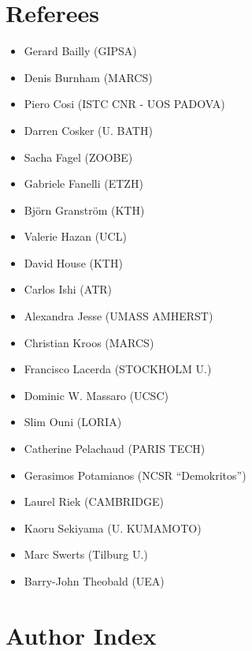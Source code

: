 \section*{Referees}
\begin{itemize}
\item Gerard Bailly (GIPSA)
\item Denis Burnham (MARCS)
\item Piero Cosi (ISTC CNR - UOS PADOVA)
\item Darren Cosker (U. BATH)
\item Sacha Fagel (ZOOBE)
\item Gabriele Fanelli (ETZH)
\item Björn Granström (KTH)
\item Valerie Hazan (UCL)
\item David House (KTH)
\item Carlos Ishi (ATR)
\item Alexandra Jesse (UMASS AMHERST)
\item Christian Kroos (MARCS)
\item Francisco Lacerda (STOCKHOLM U.)
\item Dominic W. Massaro (UCSC)
\item Slim Ouni (LORIA)
\item Catherine Pelachaud (PARIS TECH)
\item Gerasimos Potamianos (NCSR ``Demokritos'')
\item Laurel Riek (CAMBRIDGE)
\item Kaoru Sekiyama (U. KUMAMOTO)
\item Marc Swerts (Tilburg U.)
\item Barry-John Theobald (UEA)
\end{itemize}
\newpage
\tableofcontents

\cleardoublepage

\cleardoublepage


\section*{Author Index}
\begin{multicols}{2}
\printauthorindex
\end{multicols}


